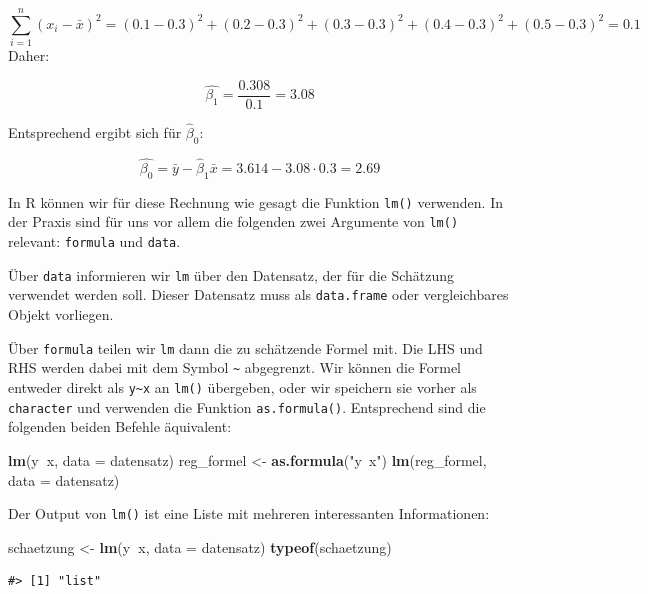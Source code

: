 \documentclass[]{book}
\newenvironment{Shaded}{\begin{snugshade}}{\end{snugshade}}
\newcommand{\KeywordTok}[1]{\textcolor[rgb]{0.13,0.29,0.53}{\textbf{#1}}}
\newcommand{\DataTypeTok}[1]{\textcolor[rgb]{0.13,0.29,0.53}{#1}}
\newcommand{\StringTok}[1]{\textcolor[rgb]{0.31,0.60,0.02}{#1}}
\newcommand{\OperatorTok}[1]{\textcolor[rgb]{0.81,0.36,0.00}{\textbf{#1}}}
\newcommand{\NormalTok}[1]{#1}
\begin{document}
\[\sum_{i=1}^n(x_i-\bar{x})^2=(0.1-0.3)^2+(0.2-0.3)^2+(0.3-0.3)^2+(0.4-0.3)^2+(0.5-0.3)^2=0.1\]
Daher:

\[\hat{\beta_1}=\frac{0.308}{0.1}=3.08\]

Entsprechend ergibt sich für \(\hat{\beta}_0\):

\[\hat{\beta_0}=\bar{y}-\hat{\beta}_1\bar{x}=3.614-3.08\cdot 0.3=2.69\]

In R können wir für diese Rechnung wie gesagt die Funktion \texttt{lm()}
verwenden. In der Praxis sind für uns vor allem die folgenden zwei
Argumente von \texttt{lm()} relevant: \texttt{formula} und
\texttt{data}.

Über \texttt{data} informieren wir \texttt{lm} über den Datensatz, der
für die Schätzung verwendet werden soll. Dieser Datensatz muss als
\texttt{data.frame} oder vergleichbares Objekt vorliegen.

Über \texttt{formula} teilen wir \texttt{lm} dann die zu schätzende
Formel mit. Die LHS und RHS werden dabei mit dem Symbol
\texttt{\textasciitilde{}} abgegrenzt. Wir können die Formel entweder
direkt als \texttt{y\textasciitilde{}x} an \texttt{lm()} übergeben, oder
wir speichern sie vorher als \texttt{character} und verwenden die
Funktion \texttt{as.formula()}. Entsprechend sind die folgenden beiden
Befehle äquivalent:

\begin{Shaded}
\begin{Highlighting}[]
\KeywordTok{lm}\NormalTok{(y}\OperatorTok{~}\NormalTok{x, }\DataTypeTok{data =}\NormalTok{ datensatz)}
\NormalTok{reg_formel <-}\StringTok{ }\KeywordTok{as.formula}\NormalTok{(}\StringTok{"y~x"}\NormalTok{)}
\KeywordTok{lm}\NormalTok{(reg_formel, }\DataTypeTok{data =}\NormalTok{ datensatz)}
\end{Highlighting}
\end{Shaded}

Der Output von \texttt{lm()} ist eine Liste mit mehreren interessanten
Informationen:

\begin{Shaded}
\begin{Highlighting}[]
\NormalTok{schaetzung <-}\StringTok{ }\KeywordTok{lm}\NormalTok{(y}\OperatorTok{~}\NormalTok{x, }\DataTypeTok{data =}\NormalTok{ datensatz)}
\KeywordTok{typeof}\NormalTok{(schaetzung)}
\end{Highlighting}
\end{Shaded}

\begin{verbatim}
#> [1] "list"
\end{verbatim}
\end{document}
